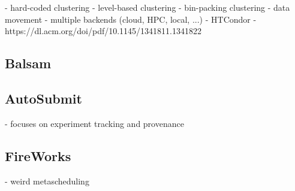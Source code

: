 - hard-coded clustering
- level-based clustering
- bin-packing clustering
- data movement
- multiple backends (cloud, HPC, local, ...)
- HTCondor
- https://dl.acm.org/doi/pdf/10.1145/1341811.1341822

\subsection*{Balsam}


\subsection*{AutoSubmit}

- focuses on experiment tracking and provenance

\subsection*{FireWorks}


- weird metascheduling

